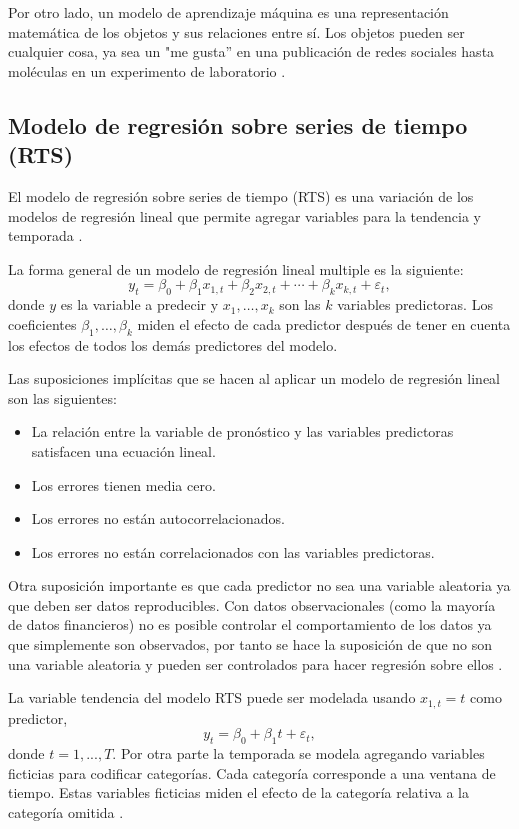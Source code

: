 Por otro lado, un modelo de aprendizaje máquina es una representación matemática de los objetos y sus relaciones entre sí. Los objetos pueden ser cualquier cosa, ya sea un "me gusta'' en una publicación de redes sociales hasta moléculas en un experimento de laboratorio \parencite{parsonsQueEsModelo2021}.

\subsection{Modelo de regresión sobre series de tiempo (RTS)}
El modelo de regresión sobre series de tiempo (RTS) es una variación de los modelos de regresión lineal que permite agregar variables para la tendencia y temporada \parencite{TslmFitLinear}. 

La forma general de un modelo de regresión lineal multiple es la siguiente:
\[
y_{t}=\beta_{0}+\beta_{1} x_{1, t}+\beta_{2} x_{2, t}+\cdots+\beta_{k} x_{k, t}+\varepsilon_{t},
\]
donde $y$ es la variable a predecir y $x_{1}, \ldots, x_{k}$ son las $k$ variables predictoras.
Los coeficientes $\beta_{1}, \ldots, \beta_{k}$ miden el efecto de cada predictor después de tener en cuenta los efectos de todos los demás predictores del modelo.

Las suposiciones implícitas que se hacen al aplicar un modelo de regresión lineal son las siguientes:

\begin{itemize}
\item La relación entre la variable de pronóstico y las variables predictoras satisfacen una ecuación lineal.
\item Los errores tienen media cero.
\item Los errores no están autocorrelacionados.
\item Los errores no están correlacionados con las variables predictoras.
\end{itemize}

Otra suposición importante es que cada predictor no sea una variable aleatoria ya que deben ser datos reproducibles. Con datos observacionales (como la mayoría de datos financieros) no es posible controlar el comportamiento de los datos ya que simplemente son observados, por tanto se hace la suposición de que no son una variable aleatoria y pueden ser controlados para hacer regresión sobre ellos \parencite{hyndmanForecastingPrinciplesPractice2018}.

La variable tendencia del modelo RTS puede ser modelada usando $x_{1, t}=t$ como predictor,
\[
y_{t}=\beta_{0}+\beta_{1} t+\varepsilon_{t},
\]
donde $t=1,...,T$. Por otra parte la temporada se modela agregando variables ficticias para codificar categorías. Cada categoría corresponde a una ventana de tiempo. Estas variables ficticias miden el efecto de la categoría relativa a la categoría omitida \parencite{hyndmanForecastingPrinciplesPractice2018}. 

